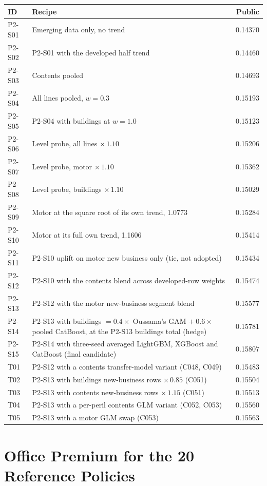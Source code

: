 \begin{center}
\small
\begin{tabular}{lp{10.4cm}r}
\hline
ID & Recipe & Public\\
\hline
P2-S01 & Emerging data only, no trend & 0.14370\\
P2-S02 & P2-S01 with the developed half trend & 0.14460\\
P2-S03 & Contents pooled & 0.14693\\
P2-S04 & All lines pooled, $w = 0.3$ & 0.15193\\
P2-S05 & P2-S04 with buildings at $w = 1.0$ & 0.15123\\
P2-S06 & Level probe, all lines $\times\,1.10$ & 0.15206\\
P2-S07 & Level probe, motor $\times\,1.10$ & 0.15362\\
P2-S08 & Level probe, buildings $\times\,1.10$ & 0.15029\\
P2-S09 & Motor at the square root of its own trend, 1.0773 & 0.15284\\
P2-S10 & Motor at its full own trend, 1.1606 & 0.15414\\
P2-S11 & P2-S10 uplift on motor new business only (tie, not adopted) & 0.15434\\
P2-S12 & P2-S10 with the contents blend across developed-row weights & 0.15474\\
P2-S13 & P2-S12 with the motor new-business segment blend & 0.15577\\
P2-S14 & P2-S13 with buildings $= 0.4\times$ Oussama's GAM $+\ 0.6\times$ pooled CatBoost, at the P2-S13 buildings total (hedge) & 0.15781\\
P2-S15 & P2-S14 with three-seed averaged LightGBM, XGBoost and CatBoost (final candidate) & 0.15807\\
T01 & P2-S12 with a contents transfer-model variant (C048, C049) & 0.15483\\
T02 & P2-S13 with buildings new-business rows $\times\,0.85$ (C051) & 0.15504\\
T03 & P2-S13 with contents new-business rows $\times\,1.15$ (C051) & 0.15513\\
T04 & P2-S13 with a per-peril contents GLM variant (C052, C053) & 0.15560\\
T05 & P2-S13 with a motor GLM swap (C053) & 0.15563\\
\hline
\end{tabular}
\end{center}

\clearpage
\section{Office Premium for the 20 Reference Policies}
\label{ov:app-op}

